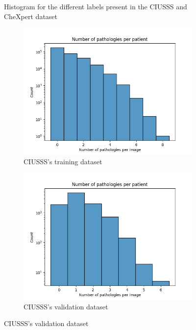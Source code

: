 \documentclass[11pt]{article}
\begin{document}
\begin{figure}[h!]
     \caption{Histogram for the different labels present in the CIUSSS and CheXpert dataset}

\end{figure}
\newpage
\begin{figure}[H]
     \centering
     \begin{subfigure}[b]{0.45\linewidth}
         \centering
         \includegraphics[width=\linewidth]{plots/disease_count_ciusss_train}
         \caption{CIUSSS's training dataset}
         \vspace{4ex}
         \label{fig:count_ciusss_train}
     \end{subfigure}
     \hfill
     \begin{subfigure}[b]{0.45\linewidth}
         \centering
         \includegraphics[width=\linewidth]{plots/disease_count_ciusss_valid}
         \caption{CIUSSS's validation dataset}
         \vspace{4ex}
         \label{fig:count_ciusss_valid}
     \end{subfigure}



\end{figure}
\end{document}
